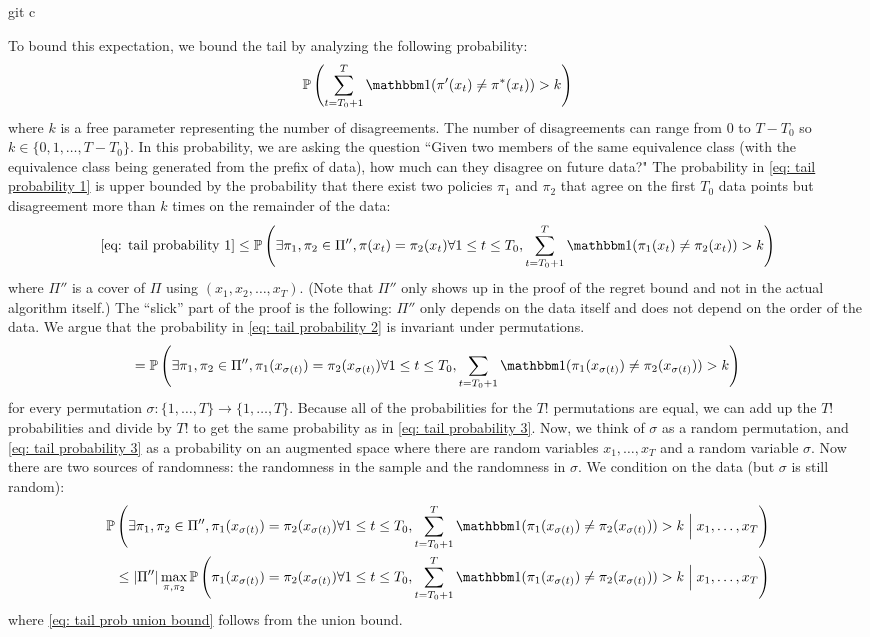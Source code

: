 git c\documentclass[11pt]{article}
\begin{document}
To bound this expectation, we bound the tail by analyzing the following probability:
\begin{equation}\label{eq: tail probability 1}
\prob{\sum_{t=T_0+1}^T\ind(\pi'(x_t)\neq \pi^*(x_t))>k}
\end{equation}
where $k$ is a free parameter representing the number of disagreements.  The number of disagreements can range from $0$ to $T-T_0$ so $k \in \{0,1,\ldots,T-T_0\}$. In this probability, we are asking the question ``Given two members of the same equivalence class (with the equivalence class being generated from the prefix of data), how much can they disagree on future data?" The probability in \eqref{eq: tail probability 1} is upper bounded by the probability that there exist two policies $\pi_1$ and $\pi_2$ that agree on the first $T_0$ data points but disagreement more than $k$ times on the remainder of the data:
\begin{equation}\label{eq: tail probability 2}
\eqref{eq: tail probability 1}\le \prob{\exists \pi_1,\pi_2 \in \Pi'', \pi(x_t) = \pi_2(x_t) \forall 1 \le t \le T_0, \sum_{t=T_0+1}^T\ind(\pi_1(x_t)\neq \pi_2(x_t)) > k}
\end{equation}
where $\Pi''$ is a cover of $\Pi$ using $(x_1,x_2,\ldots,x_T)$. (Note that $\Pi''$ only shows up in the proof of the regret bound and not in the actual algorithm itself.) The ``slick'' part of the proof is the following: $\Pi''$ only depends on the data itself and does not depend on the order of the data. We argue that the probability in \eqref{eq: tail probability 2} is invariant under permutations. 
\begin{equation}\label{eq: tail probability 3}
=\prob{\exists \pi_1,\pi_2 \in \Pi'', \pi_1(x_{\sigma(t)})= \pi_2(x_{\sigma(t)}) \forall 1 \le t \le T_0, \sum_{t=T_0+1} \ind(\pi_1(x_{\sigma(t)})\neq \pi_2(x_{\sigma(t)})) > k}
\end{equation} 
for every permutation $\sigma: \{1,\ldots,T\} \rightarrow \{1,\ldots,T\}$. Because all of the probabilities for the $T!$ permutations are equal, we can add up the $T!$ probabilities and divide by $T!$ to get the same probability as in \eqref{eq: tail probability 3}. Now, we think of $\sigma$ as a random permutation, and \eqref{eq: tail probability 3} as a probability on an augmented space where there are random variables $x_1,\ldots, x_T$ and a random variable $\sigma$. Now there are two sources of randomness: the randomness in the sample and the randomness in $\sigma$. We condition on the data (but $\sigma$ is still random):
\begin{align}\label{eq: tail probability 4}
\prob{\exists \pi_1,\pi_2 \in \Pi'', \pi_1(x_{\sigma(t)})= \pi_2(x_{\sigma(t)}) \forall 1 \le t \le T_0, \sum_{t=T_0+1}^T \ind(\pi_1(x_{\sigma(t)})\neq \pi_2(x_{\sigma(t)})) > k\;\Big|\;x_1,\ldots,x_T} \\
\le |\Pi''|\max_{\pi,\pi_2} \prob{\pi_1(x_{\sigma(t)})= \pi_2(x_{\sigma(t)}) \forall 1 \le t \le T_0, \sum_{t=T_0+1}^T \ind(\pi_1(x_{\sigma(t)})\neq \pi_2(x_{\sigma(t)})) > k\;\Big|\;x_1,\ldots,x_T}\label{eq: tail prob union bound}
\end{align} 
where \eqref{eq: tail prob union bound} follows from the union bound. 
\end{document}
